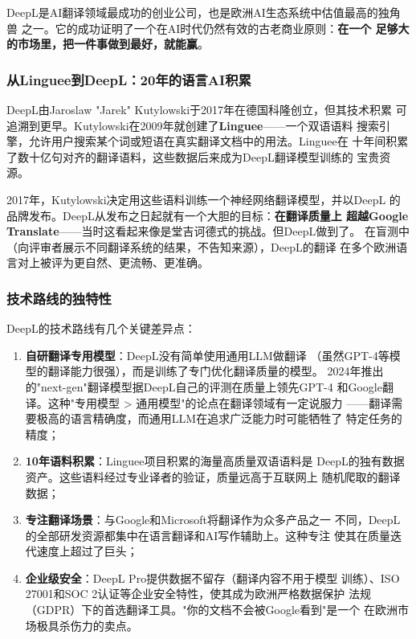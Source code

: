 DeepL是AI翻译领域最成功的创业公司，也是欧洲AI生态系统中估值最高的独角兽
之一。它的成功证明了一个在AI时代仍然有效的古老商业原则：\textbf{在一个
足够大的市场里，把一件事做到最好，就能赢}。

\subsubsection{从Linguee到DeepL：20年的语言AI积累}
DeepL由Jaroslaw "Jarek" Kutylowski于2017年在德国科隆创立，但其技术积累
可追溯到更早。Kutylowski在2009年就创建了\textbf{Linguee}——一个双语语料
搜索引擎，允许用户搜索某个词或短语在真实翻译文档中的用法。Linguee在
十年间积累了数十亿句对齐的翻译语料，这些数据后来成为DeepL翻译模型训练的
宝贵资源。

2017年，Kutylowski决定用这些语料训练一个神经网络翻译模型，并以DeepL
的品牌发布。DeepL从发布之日起就有一个大胆的目标：\textbf{在翻译质量上
超越Google Translate}——当时这看起来像是堂吉诃德式的挑战。但DeepL做到了。
在盲测中（向评审者展示不同翻译系统的结果，不告知来源），DeepL的翻译
在多个欧洲语言对上被评为更自然、更流畅、更准确。

\subsubsection{技术路线的独特性}
DeepL的技术路线有几个关键差异点：

\begin{enumerate}
  \item \textbf{自研翻译专用模型}：DeepL没有简单使用通用LLM做翻译
    （虽然GPT-4等模型的翻译能力很强），而是训练了专门优化翻译质量的模型。
    2024年推出的"next-gen"翻译模型据DeepL自己的评测在质量上领先GPT-4
    和Google翻译。这种"专用模型 > 通用模型"的论点在翻译领域有一定说服力
    ——翻译需要极高的语言精确度，而通用LLM在追求广泛能力时可能牺牲了
    特定任务的精度；
  \item \textbf{10年语料积累}：Linguee项目积累的海量高质量双语语料是
    DeepL的独有数据资产。这些语料经过专业译者的验证，质量远高于互联网上
    随机爬取的翻译数据；
  \item \textbf{专注翻译场景}：与Google和Microsoft将翻译作为众多产品之一
    不同，DeepL的全部研发资源都集中在语言翻译和AI写作辅助上。这种专注
    使其在质量迭代速度上超过了巨头；
  \item \textbf{企业级安全}：DeepL Pro提供数据不留存（翻译内容不用于模型
    训练）、ISO 27001和SOC 2认证等企业安全特性，使其成为欧洲严格数据保护
    法规（GDPR）下的首选翻译工具。"你的文档不会被Google看到"是一个
    在欧洲市场极具杀伤力的卖点。
\end{enumerate}

